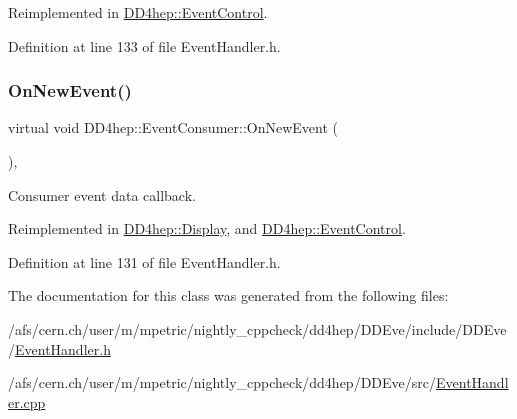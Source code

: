 Reimplemented in \hyperlink{class_d_d4hep_1_1_event_control_a651a44af5e16dd7c9f98e3ccec5971a2}{D\+D4hep\+::\+Event\+Control}.



Definition at line 133 of file Event\+Handler.\+h.

\hypertarget{class_d_d4hep_1_1_event_consumer_a755b12d11f8676c4f2957f6a1f26fb31}{}\label{class_d_d4hep_1_1_event_consumer_a755b12d11f8676c4f2957f6a1f26fb31} 
\subsubsection{\texorpdfstring{On\+New\+Event()}{OnNewEvent()}}
{\footnotesize\ttfamily virtual void D\+D4hep\+::\+Event\+Consumer\+::\+On\+New\+Event (\begin{DoxyParamCaption}\item[{\hyperlink{class_d_d4hep_1_1_event_handler}{Event\+Handler} $\ast$}]{ }\end{DoxyParamCaption})\hspace{0.3cm}{\ttfamily [inline]}, {\ttfamily [virtual]}}



Consumer event data callback. 



Reimplemented in \hyperlink{class_d_d4hep_1_1_display_a6bde493af2434cc4d59fa8b6b0e58058}{D\+D4hep\+::\+Display}, and \hyperlink{class_d_d4hep_1_1_event_control_af3644b3a91372e313440eaca8cf893c2}{D\+D4hep\+::\+Event\+Control}.



Definition at line 131 of file Event\+Handler.\+h.



The documentation for this class was generated from the following files\+:\begin{DoxyCompactItemize}
\item 
/afs/cern.\+ch/user/m/mpetric/nightly\+\_\+cppcheck/dd4hep/\+D\+D\+Eve/include/\+D\+D\+Eve/\hyperlink{_event_handler_8h}{Event\+Handler.\+h}\item 
/afs/cern.\+ch/user/m/mpetric/nightly\+\_\+cppcheck/dd4hep/\+D\+D\+Eve/src/\hyperlink{_event_handler_8cpp}{Event\+Handler.\+cpp}\end{DoxyCompactItemize}
